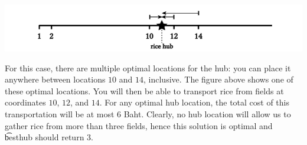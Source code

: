 \includegraphics[width=18cm]{ricehub.png}

For this case, there are multiple optimal locations for the hub: you can place it anywhere between locations $10$ and $14$, inclusive. The figure above shows one of these optimal locations. You will then be able to transport rice from fields at coordinates $10$, $12$, and $14$. For any optimal hub location, the total cost of this transportation will be at most $6$ Baht. Clearly, no hub location will allow us to gather rice from more than three fields, hence this solution is optimal and \t{besthub} should return $3$.